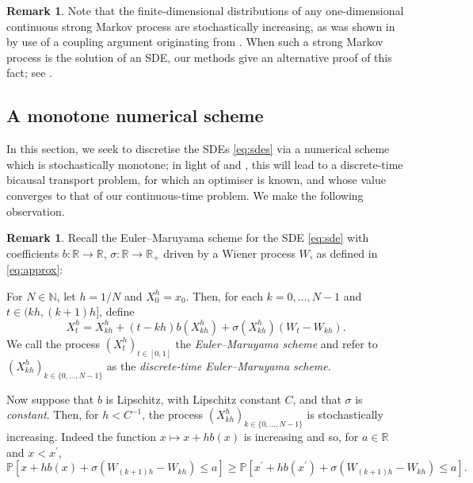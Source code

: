 \documentclass[oneside]{amsart}
\theoremstyle{definition}
\newtheorem{remark}[theorem]{Remark}
\newcommand{\N}{\mathbb N}
\newcommand{\R}{\mathbb R}
\def\P{{\mathbb P}}
\def\R{{\mathbb R}}
\numberwithin{equation}{section}
\begin{document}
\begin{remark}\label{rem:stoch-mono-fdd}
	Note that the finite-dimensional distributions of any one-dimensional continuous strong Markov process are stochastically increasing, as was shown in \citet[Proposition~5.2]{BePaSc22} by use of a coupling argument originating from \citet{Ho98c}. When such a strong Markov process is the solution of an SDE, our methods give an alternative proof of this fact; see .
\end{remark}


\subsection{A monotone numerical scheme}\label{sec:numerical-scheme}

In this section, we seek to discretise the SDEs \eqref{eq:sdes} via a numerical scheme which is stochastically monotone; in light of  and , this will lead to a discrete-time bicausal transport problem, for which an optimiser is known, and whose value converges to that of our continuous-time problem. 
We make the following observation.

\begin{remark}\label{rem:em}
	Recall the Euler--Maruyama scheme for the SDE \eqref{eq:sde} with coefficients $b\colon \R \to \R$, $\sigma \colon \R \to \R_+$ driven by a Wiener process $W$, as defined in \eqref{eq:approx}:
	
	For $N \in \N$, let $h = 1/N$ and $X^h_0 = x_0$. Then, for each $k = 0, \dotsc, N - 1$ and $t \in (kh, (k + 1)h]$, define
	\begin{equation}\label{eq:em}
		X^h_t = X^h_{kh} + (t - kh) b(X^h_{kh}) + \sigma(X^h_{kh}) (W_t - W_{kh}).
	\end{equation}
	We call the process $(X^h_t)_{t \in [0, 1]}$ the \emph{Euler--Maruyama scheme} and refer to $(X^h_{kh})_{k \in \{0, \dotsc, N - 1\}}$ as the \emph{discrete-time Euler--Maruyama scheme}.	
	
	Now suppose that $b$ is Lipschitz, with Lipschitz constant $C$, and that $\sigma$ is \emph{constant}. Then, for $h < C^{-1}$, the process $(X^h_{kh})_{k \in \{0, \dotsc, N - 1\}}$ is stochastically increasing. Indeed the function $x \mapsto x + h b(x)$ is increasing and so, for $a \in \R$ and $x < x^\prime$,
$$\P\!\left[x + h b(x) + \sigma (W_{(k+1)h} - W_{kh}) \leq a\right] \geq \P \!\left[x^\prime + h b(x^\prime) + \sigma(W_{(k + 1)h} - W_{kh})\le a\right].$$
\end{remark}
\end{document}
